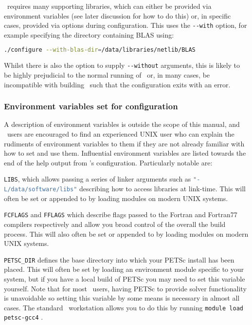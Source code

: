 \fluidity\ requires many supporting libraries, which can either be provided via
environment variables (see later discussion for how to do this) or, in specific
cases, provided via options during configuration. This uses the
\lstinline[language=Bash]+--with+ option, for example specifying the directory
containing BLAS using:

\begin{lstlisting}[language=Bash]
./configure --with-blas-dir=/data/libraries/netlib/BLAS
\end{lstlisting}

Whilst there is also the option to supply \lstinline[language=Bash]+--without+
arguments, this is likely to be highly prejudicial to the normal running of
\fluidity\ or, in many cases, be incompatible with building \fluidity\ such that
the configuration exits with an error.

\subsubsection{Environment variables set for configuration}
\label{sec:configure_environment_vars}

A description of environment variables is outside the scope of this manual, and
\fluidity\ users are encouraged to find an experienced UNIX user who can explain
the rudiments of environment variables to them if they are not already familiar
with how to set and use them. Influential environment variables are listed
towards the end of the help output from \fluidity's configuration. Particularly
notable are:

\lstinline[language=Bash]+LIBS+, which allows passing a series of linker
arguments such as \lstinline[language=Bash]+"-L/data/software/libs"+ describing
how to access libraries at link-time. This will often be set or appended to by
loading modules on modern UNIX systems.

\lstinline[language=Bash]+FCFLAGS+ and \lstinline[language=Bash]+FFLAGS+ which
describe flags passed to the Fortran and Fortran77 compilers respectively and
allow you broad control of the overall the build process. This will also often
be set or appended to by loading modules on modern UNIX systems.

\lstinline[language=Bash]+PETSC_DIR+ defines the base directory into which your
PETSc install has been placed. This will often be set by loading an environment
module specific to your system, but if you have a local build of PETSc you may
need to set this variable yourself. Note that for most \fluidity\ users, having
PETSc to provide solver functionality is unavoidable so setting this variable
by some means is necessary in almost all cases. The standard \fluidity\
workstation allows you to do this by running
\lstinline[language=Bash]+module load petsc-gcc4+ .

